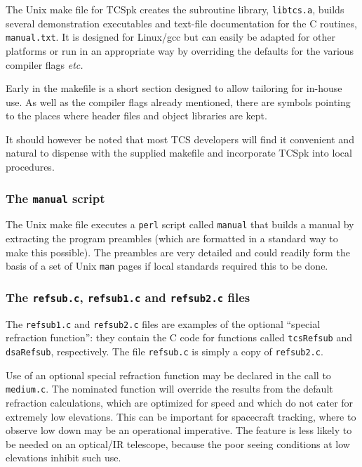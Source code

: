 \documentclass[12pt,fleqn,twoside]{article}
\renewcommand{\_}{{\tt\char'137}}     %
\begin{document}
The Unix make file for TCSpk creates the subroutine library,
{\tt libtcs.a}, builds several demonstration executables and
text-file documentation for the C routines,
{\tt manual.txt}.  It is designed for Linux/gcc but
can easily be adapted for other platforms or run in an
appropriate way by overriding the defaults for the
various compiler flags {\it etc.}

Early in the makefile is a short section designed to allow
tailoring for in-house use.  As well as the compiler flags
already mentioned, there are symbols pointing to the
places where header files and object libraries are kept.

It should however be noted that most
TCS developers will find it convenient and natural to dispense with
the supplied makefile and incorporate TCSpk into local procedures.

\subsubsection{The {\tt manual} script}
\label{manual}

The Unix make file executes a {\tt perl} script called {\tt manual}
that builds a manual by extracting the program preambles (which
are formatted in a standard way to make this possible).  The
preambles are very detailed and could readily form the basis of
a set of Unix {\tt man} pages if local standards required this
to be done.

\subsubsection{The {\tt refsub.c},
                   {\tt refsub1.c} and
                   {\tt refsub2.c} files}
\label{refsub}

The {\tt refsub1.c} and {\tt refsub2.c} files are examples of
the optional ``special refraction function'':  they contain the C code
for functions called {\tt tcsRefsub} and {\tt dsaRefsub}, respectively.
The file {\tt refsub.c} is simply a copy of {\tt refsub2.c}.

Use of an optional special refraction function may be declared
in the call to {\tt medium.c}.  The nominated function will
override the results from the default
refraction calculations, which are optimized for speed and which
do not cater for extremely low elevations.  This can be important
for spacecraft tracking, where to observe low down may be
an operational imperative.  The feature is less likely to be needed on an
optical/IR telescope, because the poor seeing conditions at low
elevations inhibit such use.
\end{document}
